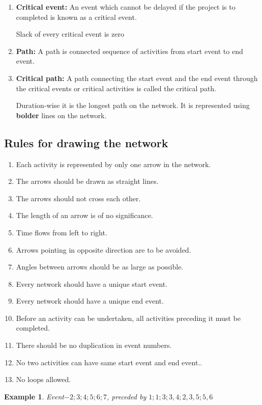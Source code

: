 \documentclass[oneside,11pt,pdftex]{book}%
\numberwithin{equation}{section}
\newtheorem{example}[theorem]{Example}
\numberwithin{section}{chapter}
\numberwithin{equation}{chapter}
\begin{document}
\begin{enumerate}
	\item \textbf{Critical event: }An event which cannot be delayed if the project is to completed is known as a critical event.\par
	Slack of every critical event is zero
	\item \textbf{Path:} A path is connected sequence of activities from start event to end event.
	\item \textbf{Critical path: }A path connecting the start event and the end event through the critical events or critical activities is called the critical path.
	\par 
	Duration-wise it is the longest path on the network. It is represented using \textbf{bolder} lines on the network.
\end{enumerate}

\subsection{Rules for drawing the network}
\begin{enumerate}
	\item Each activity is represented by only one arrow in the network.
	\item The arrows should be drawn as straight lines.
	\item The arrows should not cross each other.
	\item The length of an arrow is of no significance.
	\item Time flows from left to right.
	\item Arrows pointing in opposite direction are to be avoided.
	\item Angles between arrows should be as large as possible.
	\item Every network should have a unique start event.
	\item Every network should have a unique end event.
	\item Before an activity can be undertaken, all activities preceding it must be completed.
	\item There should be no duplication in event numbers.
	\item No two activities can have same start event and end event..
	\item No loops allowed.
\end{enumerate}

\begin{example}
	Event$ - 2;3;4;5;6;7 $, preceded by $ 1;1;3;3,4;2,3,5;5,6 $
\end{example}
\end{document}
